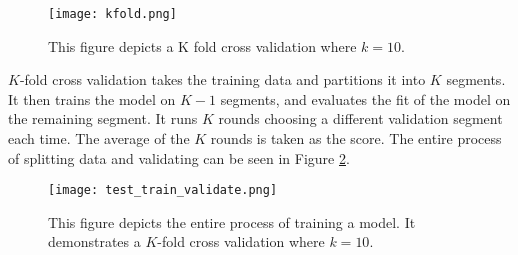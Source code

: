 \documentclass[12pt]{article}
\begin{document}
\begin{figure}[ht]
	\centering
	\texttt{[image: kfold.png]}
	\caption{This figure depicts a K fold cross validation where $k=10$. \cite{kfold}}
	\label{kfold}
\end{figure}

$K$-fold cross validation takes the training data and partitions it into $K$ segments. It then trains the model on $K-1$ segments, and evaluates the fit of the model on the remaining segment. It runs $K$ rounds choosing a different validation segment each time. The average of the $K$ rounds is taken as the score. The entire process of splitting data and validating can be seen in Figure \ref{test_train_validate}.

\begin{figure}[ht]
	\centering
	\texttt{[image: test\_train\_validate.png]}
	\caption{This figure depicts the entire process of training a model. It demonstrates a $K$-fold cross validation where $k=10$. \cite{kfold2}}
	\label{test_train_validate}
\end{figure}

\clearpage 


\end{document}
